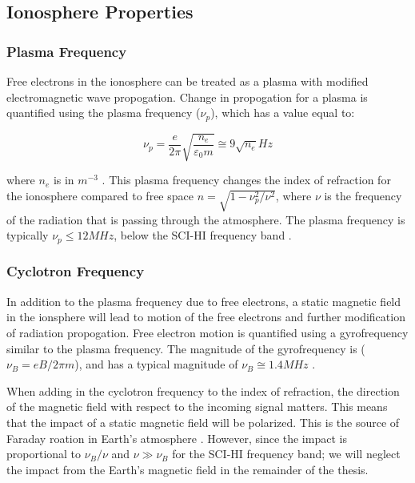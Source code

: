 \subsection{Ionosphere Properties}

\subsubsection{Plasma Frequency}

Free electrons in the ionosphere can be treated as a plasma with modified electromagnetic wave propogation. Change in propogation for a plasma is quantified using the plasma frequency ($\nu_p$), which has a value equal to:

\begin{equation}
\nu_p = \frac{e}{2 \pi} \sqrt{\frac{n_e}{\varepsilon_0 m}} \cong 9 \sqrt{n_e} Hz
\end{equation}

where $n_e$ is in $m^{-3}$ \cite{thompson_2001}. This plasma frequency changes the index of refraction for the ionosphere compared to free space $n = \sqrt{1-\nu_p^2/\nu^2}$, where $\nu$ is the frequency of the radiation that is passing through the atmosphere. The plasma frequency is typically $\nu_p \leq 12 MHz$, below the SCI-HI frequency band \cite{thompson_2001}. 

\subsubsection{Cyclotron Frequency}

In addition to the plasma frequency due to free electrons, a static magnetic field in the ionsphere will lead to motion of the free electrons and further modification of radiation propogation. Free electron motion is quantified using a gyrofrequency similar to the plasma frequency. The magnitude of the gyrofrequency is ($\nu_B = eB/2 \pi m$), and has a typical magnitude of $\nu_B \cong 1.4 MHz$ \cite{thompson_2001}. 

When adding in the cyclotron frequency to the index of refraction, the direction of the magnetic field with respect to the incoming signal matters. This means that the impact of a static magnetic field will be polarized. This is the source of Faraday roation in Earth's atmosphere \cite{thompson_2001}. However, since the impact is proportional to $\nu_B/\nu$ and $\nu \gg \nu_B$ for the SCI-HI frequency band; we will neglect the impact from the Earth's magnetic field in the remainder of the thesis. 


